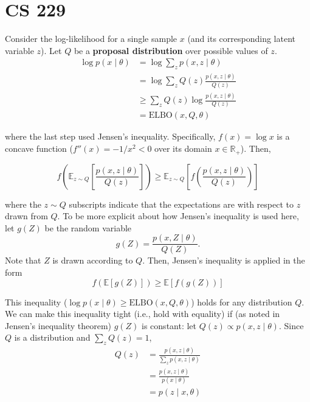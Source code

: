 \documentclass[11pt]{article}
\theoremstyle{definition}
\begin{document}
\section{CS 229}

Consider the log-likelihood for a single sample $x$ (and its corresponding latent variable $z$). Let $Q$ be a \textbf{proposal distribution} over possible values of $z$.
$$
\begin{aligned}
\log p(x \mid \theta)
&= \log \sum_z p(x, z \mid \theta) \\
&= \log \sum_z Q(z) \frac{p(x, z \mid \theta)}{Q(z)} \\
&\geq \sum_z Q(z) \log \frac{p(x, z \mid \theta)}{Q(z)} \\
&= \text{ELBO}(x, Q, \theta)
\end{aligned}
$$

where the last step used Jensen's inequality. Specifically, $f(x) = \log x$ is a concave function ($f''(x) = - 1/x^2 < 0$ over its domain $x \in \mathbb{R}_+$). Then,

$$
f\left(\mathbb{E}_{z \sim Q} \left[\frac{p(x, z \mid \theta)}{Q(z)}\right]\right)
\geq \mathbb{E}_{z \sim Q} \left[f\left( \frac{p(x, z \mid \theta)}{Q(z)}\right) \right]
$$

where the $z \sim Q$ subscripts indicate that the expectations are with respect to $z$ drawn from $Q$. To be more explicit about how Jensen's inequality is used here, let $g(Z)$ be the random variable
$$
g(Z) = \frac{p(x, Z \mid \theta)}{Q(Z)}.
$$
Note that $Z$ is drawn according to $Q$. Then, Jensen's inequality is applied in the form
$$
f(\mathbb{E}[g(Z)]) \geq \mathbb{E}[f(g(Z))]
$$

This inequality ($\log p(x \mid \theta) \geq \text{ELBO}(x, Q, \theta)$) holds for any distribution $Q$. We can make this inequality tight (i.e., hold with equality) if (as noted in Jensen's inequality theorem) $g(Z)$ is constant: let $Q(z) \propto p(x, z \mid \theta)$. Since $Q$ is a distribution and $\sum_z Q(z) = 1$,
$$
\begin{aligned}
Q(z)
&= \frac{p(x, z \mid \theta)}{\sum_z p(x, z \mid \theta)} \\
&= \frac{p(x, z \mid \theta)}{p(x \mid \theta)} \\
&= p(z \mid x, \theta)
\end{aligned}
$$
\end{document}
